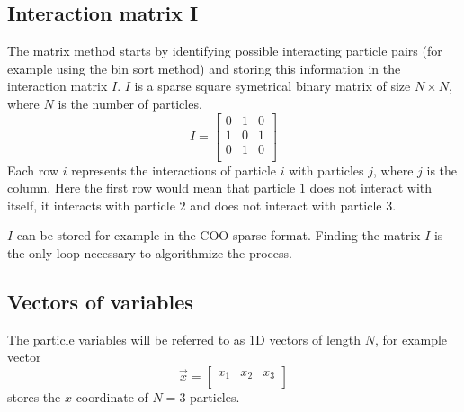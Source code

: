 \documentclass{article}
\begin{document}
\subsection{Interaction matrix I}
The matrix method starts by identifying possible interacting particle pairs (for example using the bin sort method) and storing this information in the interaction matrix $I$. $I$ is a sparse square symetrical binary matrix of size $N\times N$, where $N$ is the number of particles.
$$I = 
\begin{bmatrix}
0 & 1 & 0\\
1 & 0 & 1\\
0 & 1 & 0\\
\end{bmatrix}
$$
Each row $i$ represents the interactions of particle $i$ with particles $j$, where $j$ is the column. Here the first row would mean that particle $1$ does not interact with itself, it interacts with particle $2$ and does not interact with particle $3$. 

$I$ can be stored for example in the COO sparse format. Finding the matrix $I$ is the only loop necessary to algorithmize the process.
\subsection{Vectors of variables}
The particle variables will be referred to as 1D vectors of length $N$, for example vector
$$
\vec{x}=
\begin{bmatrix}
x_1 & x_2 & x_3\\
\end{bmatrix}
$$
stores the $x$ coordinate of $N=3$ particles.
\end{document}
